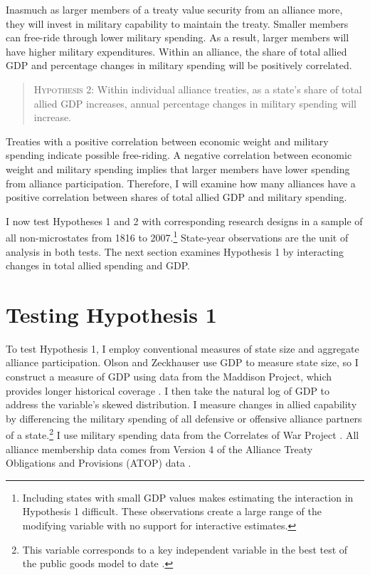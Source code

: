 \documentclass[12pt]{article}
\begin{document}
Inasmuch as larger members of a treaty value security from an alliance more, they will invest in military capability to maintain the treaty.
Smaller members can free-ride through lower military spending. 
As a result, larger members will have higher military expenditures. 
Within an alliance, the share of total allied GDP and percentage changes in military spending will be positively correlated. 


\begin{quote}
\textsc{Hypothesis 2}: Within individual alliance treaties, as a state's share of total allied GDP increases, annual percentage changes in military spending will increase. 
\end{quote}


Treaties with a positive correlation between economic weight and military spending indicate possible free-riding. 
A negative correlation between economic weight and military spending implies that larger members have lower spending from alliance participation. 
Therefore, I will examine how many alliances have a positive correlation between shares of total allied GDP and military spending.  


I now test Hypotheses 1 and 2 with corresponding research designs in a sample of all non-microstates from 1816 to 2007.\footnote{Including states with small GDP values makes estimating the interaction in Hypothesis 1 difficult. These observations create a large range of the modifying variable with no support for interactive estimates.}
State-year observations are the unit of analysis in both tests.  
The next section examines Hypothesis 1 by interacting changes in total allied spending and GDP.


\section{Testing Hypothesis 1}


To test Hypothesis 1, I employ conventional measures of state size and aggregate alliance participation. 
Olson and Zeckhauser use GDP to measure state size, so I construct a measure of GDP using data from the Maddison Project, which provides longer historical coverage \citep{Boltetal2018}. 
I then take the natural log of GDP to address the variable's skewed distribution. 
I measure changes in allied capability by differencing the military spending of all defensive or offensive alliance partners of a state.\footnote{This variable corresponds to a key independent variable in the best test of the public goods model to date \citep{PluemperNeumayer2015}.}
I use military spending data from the Correlates of War Project \citep{SingerCINC1988}.  
All alliance membership data comes from Version 4 of the Alliance Treaty Obligations and Provisions (ATOP) data \citep{Leedsetal2002}.  
\end{document}
